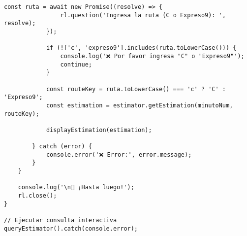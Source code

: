 \documentclass[12pt,a4paper]{article}
\begin{document}
\begin{lstlisting}[caption=query-estimator.js completo]
            const ruta = await new Promise((resolve) => {
                rl.question('Ingresa la ruta (C o Expreso9): ', resolve);
            });
            
            if (!['c', 'expreso9'].includes(ruta.toLowerCase())) {
                console.log('❌ Por favor ingresa "C" o "Expreso9"');
                continue;
            }
            
            const routeKey = ruta.toLowerCase() === 'c' ? 'C' : 'Expreso9';
            const estimation = estimator.getEstimation(minutoNum, routeKey);
            
            displayEstimation(estimation);
            
        } catch (error) {
            console.error('❌ Error:', error.message);
        }
    }
    
    console.log('\n👋 ¡Hasta luego!');
    rl.close();
}

// Ejecutar consulta interactiva
queryEstimator().catch(console.error);
\end{lstlisting}
\end{document}
